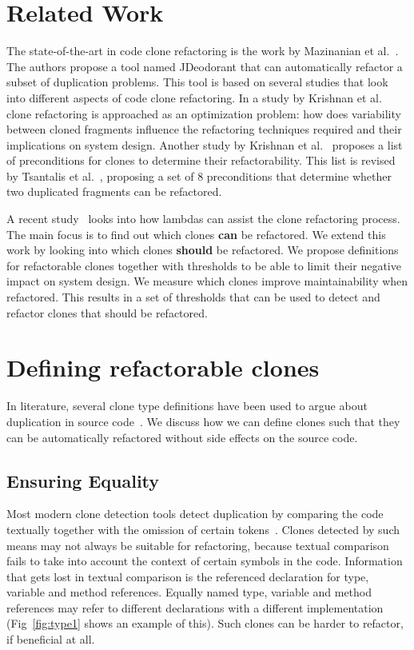 \documentclass[]{IEEEtran}
\begin{document}
\section{Related Work}
The state-of-the-art in code clone refactoring is the work by Mazinanian et al.~\cite{mazinanian2016jdeodorant}. The authors propose a tool named JDeodorant that can automatically refactor a subset of duplication problems. This tool is based on several studies that look into different aspects of code clone refactoring. In a study by Krishnan et al.~\cite{krishnan2013refactoring} clone refactoring is approached as an optimization problem: how does variability between cloned fragments influence the refactoring techniques required and their implications on system design. Another study by Krishnan et al.~\cite{krishnan2014unification} proposes a list of preconditions for clones to determine their refactorability. This list is revised by Tsantalis et al.~\cite{tsantalis2015assessing}, proposing a set of 8 preconditions that determine whether two duplicated fragments can be refactored.

A recent study~\cite{tsantalis2017clone} looks into how lambdas can assist the clone refactoring process. The main focus is to find out which clones \textbf{can} be refactored. We extend this work by looking into which clones \textbf{should} be refactored. We propose definitions for refactorable clones together with thresholds to be able to limit their negative impact on system design. We measure which clones improve maintainability when refactored. This results in a set of thresholds that can be used to detect and refactor clones that should be refactored.

\section{Defining refactorable clones}
In literature, several clone type definitions have been used to argue about duplication in source code~\cite{roy2007survey}. We discuss how we can define clones such that they can be automatically refactored without side effects on the source code.

\subsection{Ensuring Equality}\label{sec:t1r}
Most modern clone detection tools detect duplication by comparing the code textually together with the omission of certain tokens~\cite{roy2009comparison, svajlenko2014evaluating}. Clones detected by such means may not always be suitable for refactoring, because textual comparison fails to take into account the context of certain symbols in the code. Information that gets lost in textual comparison is the referenced declaration for type, variable and method references. Equally named type, variable and method references may refer to different declarations with a different implementation (Fig~\ref{fig:type1} shows an example of this). Such clones can be harder to refactor, if beneficial at all.
\end{document}
